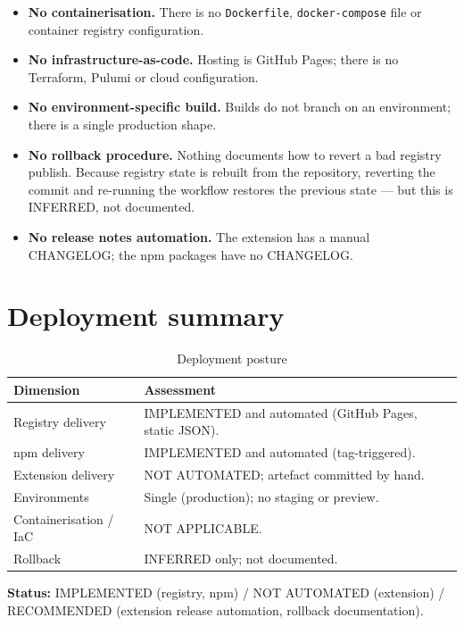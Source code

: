 \begin{itemize}
  \item \textbf{No containerisation.} There is no \texttt{Dockerfile},
        \texttt{docker-compose} file or container registry configuration.
  \item \textbf{No infrastructure-as-code.} Hosting is GitHub Pages; there is no
        Terraform, Pulumi or cloud configuration.
  \item \textbf{No environment-specific build.} Builds do not branch on an
        environment; there is a single production shape.
  \item \textbf{No rollback procedure.} Nothing documents how to revert a bad
        registry publish. Because registry state is rebuilt from the repository,
        reverting the commit and re-running the workflow restores the previous
        state --- but this is INFERRED, not documented.
  \item \textbf{No release notes automation.} The extension has a manual
        CHANGELOG; the npm packages have no CHANGELOG.
\end{itemize}

\section{Deployment summary}

\begin{table}[H]
\centering
\caption{Deployment posture}
\begin{tabular}{p{4cm}p{10.2cm}}
\toprule
\textbf{Dimension} & \textbf{Assessment} \\
\midrule
Registry delivery & IMPLEMENTED and automated (GitHub Pages, static JSON). \\
npm delivery & IMPLEMENTED and automated (tag-triggered). \\
Extension delivery & NOT AUTOMATED; artefact committed by hand. \\
Environments & Single (production); no staging or preview. \\
Containerisation / IaC & NOT APPLICABLE. \\
Rollback & INFERRED only; not documented. \\
\bottomrule
\end{tabular}
\end{table}

\textbf{Status:} IMPLEMENTED (registry, npm) / NOT AUTOMATED (extension) /
RECOMMENDED (extension release automation, rollback documentation).
